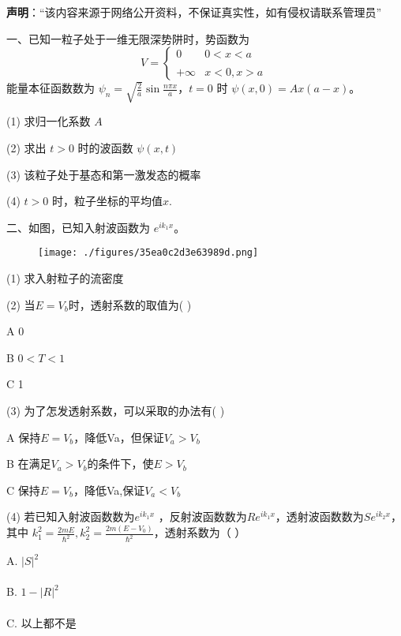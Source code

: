 
\textbf{声明}：“该内容来源于网络公开资料，不保证真实性，如有侵权请联系管理员”

一、已知一粒子处于一维无限深势阱时，势函数为
$$V = \begin{cases} 0 & 0 < x < a \\\\+\infty & x < 0, x > a \end{cases}~$$
能量本征函数数为 $\psi_n = \sqrt{\frac{2}{a}} \sin \frac{n\pi x}{a}$，$t = 0$ 时 $\psi(x, 0) = A x (a - x)$。

(1) 求归一化系数 $A$

(2) 求出 $t > 0$ 时的波函数 $\psi(x, t)$

(3) 该粒子处于基态和第一激发态的概率

(4) $t > 0$ 时，粒子坐标的平均值$x$.

二、如图，已知入射波函数为 $e^{ik_1x}$。
\begin{figure}[ht]
\centering
\texttt{[image: ./figures/35ea0c2d3e63989d.png]}
\caption{} \label{fig_UCSA17_2}
\end{figure}
(1) 求入射粒子的流密度

(2) 当$E = V_b$时，透射系数的取值为( )

A 0

B $0 < T < 1$

C 1

(3) 为了怎发透射系数，可以采取的办法有( )

A 保持$E = V_b$，降低Va，但保证$V_a > V_b$

B 在满足$V_a > V_b$的条件下，使$E > V_b$

C 保持$E = V_b$，降低Va,保证$V_a < V_b$

(4) 若已知入射波函数数为$ e^{ik_1x}$ ，反射波函数数为$R e^{ik_1x}$，透射波函数数为$S e^{ik_2x}$，其中 $k_1^2 = \frac{2mE}{\hbar^2}, k_2^2 = \frac{2m(E - V_0)}{\hbar^2} $，透射系数为（ ）

A. $|S|^2$ \\\\
B. $1 - |R|^2$ \\\\
C. 以上都不是
